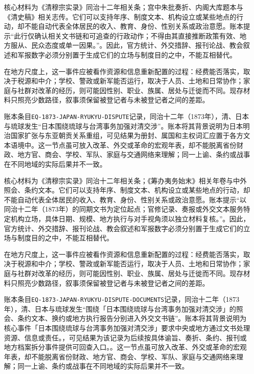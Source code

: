 核心材料为《清穆宗实录》同治十二年相关条；宫中朱批奏折、内阁大库题本与《清史稿》相关志传。它们可以支持年序、制度文本、机构设立或某些地点的行动，却不能自动代表全体居民的收入、教育、身份、性别关系或政治意愿。账本提示“此行仅确认相关文书链和可追查的行政动作；不得由其直接推断政策有效、地方服从、民众态度或单一因果。”。因此，官方统计、外交措辞、报刊论战、教会叙述和军报数字必须分别置于生成它们的立场与制度目的之中，不能互相替代。

在地方尺度上，这一事件应被看作资源和信息重新配置的过程：经费能否落实，取决于税源和中介；学校、警政或新军能否运行，取决于人员、土地和日常协作；家庭与社群对改革的经历，则可能因性别、职业、族属、居处与迁徙而不同。现存材料只照亮少数路径，叙事须保留被登记者与未被登记者之间的差距。

账本条目\texttt{EQ-1873-JAPAN-RYUKYU-DISPUTE}记录，同治十二年（1873年），清、日本与琉球发生“日本围绕琉球与台湾事务加强对清交涉”。账本将其背景说明为日本明治国家扩张与东亚朝贡关系重组，可见结果为册封、属国和主权词汇应置于各方文本语境中。这一节点虽可放入改革、外交或革命的宏观年表，却不能脱离省份财政、地方官、商会、学校、军队、家庭与交通网络来理解；同一上谕、条约或战事在不同地域的实际后果并不一致。

核心材料为《清穆宗实录》同治十二年相关条；《筹办夷务始末》相关年卷与中外照会、条约文本。它们可以支持年序、制度文本、机构设立或某些地点的行动，却不能自动代表全体居民的收入、教育、身份、性别关系或政治意愿。账本提示“以同治十二年（1873年）的同期文书为定位起点；官修记录、奏报或外交文本服务特定机构立场，具体日期、规模、地方执行与对手视角须以独立材料复核。”。因此，官方统计、外交措辞、报刊论战、教会叙述和军报数字必须分别置于生成它们的立场与制度目的之中，不能互相替代。

在地方尺度上，这一事件应被看作资源和信息重新配置的过程：经费能否落实，取决于税源和中介；学校、警政或新军能否运行，取决于人员、土地和日常协作；家庭与社群对改革的经历，则可能因性别、职业、族属、居处与迁徙而不同。现存材料只照亮少数路径，叙事须保留被登记者与未被登记者之间的差距。

账本条目\texttt{EQ-1873-JAPAN-RYUKYU-DISPUTE-DOCUMENTS}记录，同治十二年（1873年），清、日本与琉球发生“围绕「日本围绕琉球与台湾事务加强对清交涉」的照会、条约文本、换约或地方执行报告分别进入外交文书链”。账本将其背景说明为核心事件「日本围绕琉球与台湾事务加强对清交涉」要求中央或地方通过文书处理资源、信息或责任。，可见结果为该记录为后续按具体谕旨、奏折、条约、报刊或地方档案拆分事件提供可回查入口。。这一节点虽可放入改革、外交或革命的宏观年表，却不能脱离省份财政、地方官、商会、学校、军队、家庭与交通网络来理解；同一上谕、条约或战事在不同地域的实际后果并不一致。

